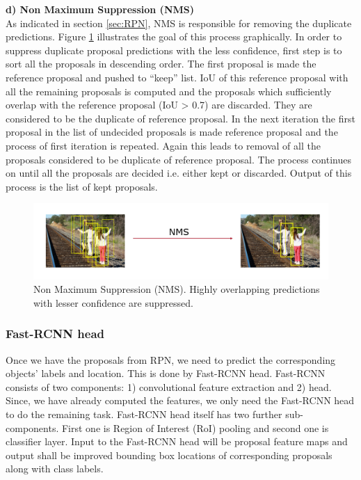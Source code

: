 \textbf{d) Non Maximum Suppression (NMS)} \\
As indicated in section \ref{sec:RPN}, NMS is responsible for removing the duplicate predictions. Figure \ref{fig:nms} illustrates the goal of this process graphically. In order to suppress duplicate proposal predictions with the less confidence, first step is to sort all the proposals in descending order. The first proposal is made  the reference proposal and pushed to ``keep'' list. IoU of this reference proposal with all the remaining proposals is computed and the proposals which sufficiently overlap with the reference proposal (IoU > 0.7) are discarded. They are considered to be the duplicate of reference proposal. In the next iteration the first proposal in the list of undecided proposals is made reference proposal and the process of first iteration is repeated. Again this leads to removal of all the proposals considered to be duplicate of reference proposal. The process continues on until all the proposals are decided i.e. either kept or discarded. Output of this process is the list of kept proposals. 


\begin{figure}
    \centering
    \includegraphics[width=\linewidth]{images/nms.PNG}
    \caption[Non Maximum Suppression (NMS)]{Non Maximum Suppression (NMS). Highly overlapping predictions with lesser confidence are suppressed.}
    \label{fig:nms}
\end{figure}

\subsubsection{Fast-RCNN head}
Once we have the proposals from RPN, we need to predict the corresponding objects' labels and location. This is done by Fast-RCNN head. Fast-RCNN consists of two components: 1) convolutional feature extraction and  2) head. Since, we have already computed the features, we only need the Fast-RCNN head to do the remaining task. Fast-RCNN head itself has two further sub-components. First one is Region of Interest (RoI) pooling and second one is classifier layer. Input to the Fast-RCNN head will be proposal feature maps and output shall be improved bounding box locations of corresponding proposals along with class labels. 


